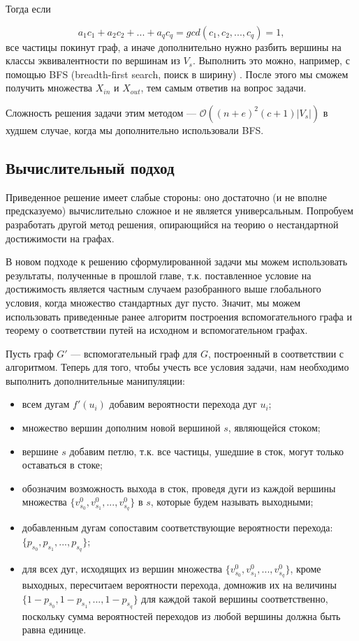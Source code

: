 Тогда если 

\begin{equation*}
a_1c_1 + a_2c_2 + ... + a_qc_q = gcd(c_1, c_2, ... , c_q) = 1,
\end{equation*}	все частицы покинут граф, а иначе дополнительно нужно разбить вершины на классы эквивалентности по вершинам из $V_s$. Выполнить это можно, например, с помощью BFS (breadth-first search, поиск в ширину) \cite{BFS}. После этого мы сможем получить множества $X_{in}$ и $X_{out}$, тем самым ответив на вопрос задачи. 

Сложность решения задачи этим методом --- $\mathcal{O}((n + e)^2(c + 1)|V_s|)$ в худшем случае, когда мы дополнительно использовали BFS.

\subsection{Вычислительный подход}

Приведенное решение имеет слабые стороны: оно достаточно (и не вполне предсказуемо) вычислительно сложное и не является универсальным. Попробуем разработать другой метод решения, опирающийся на теорию о нестандартной достижимости на графах. 

\newpage

В новом подходе к решению сформулированной задачи мы можем использовать результаты, полученные в прошлой главе, т.к. поставленное условие на достижимость является частным случаем разобранного выше глобального условия, когда множество стандартных дуг пусто. Значит, мы можем использовать приведенные ранее алгоритм построения вспомогательного графа и теорему о соответствии путей на исходном и вспомогательном графах.  

Пусть граф $G'$ --- вспомогательный граф для $G$, построенный в соответствии с алгоритмом. Теперь для того, чтобы учесть все условия задачи, нам необходимо выполнить дополнительные манипуляции:

\begin{itemize}
	\item всем дугам $f'(u_i)$ добавим вероятности перехода дуг $u_i$;
	\item множество вершин дополним новой вершиной $s$, являющейся стоком;
	\item вершине $s$ добавим петлю, т.к. все частицы, ушедшие в сток, могут только оставаться в стоке;
	\item обозначим возможность выхода в сток, проведя дуги из каждой вершины множества $\{v^0_{s_0}, v^0_{s_1}, ... , v^0_{s_q}\}$ в $s$, которые будем называть выходными;
	\item добавленным дугам сопоставим соответствующие вероятности перехода: $\{p_{s_0}, p_{s_1}, ... , p_{s_q}\}$;
	\item для всех дуг, исходящих из вершин множества $\{v^0_{s_0}, v^0_{s_1}, ... , v^0_{s_q}\}$, кроме выходных, пересчитаем вероятности перехода, 
	домножив их на величины $\{ 1 - p_{s_0}, 1 - p_{s_1}, ... , 1 - p_{s_q}\}$ для каждой такой вершины соответственно, поскольку сумма вероятностей переходов из любой вершины должна быть равна единице.
\end{itemize}	

